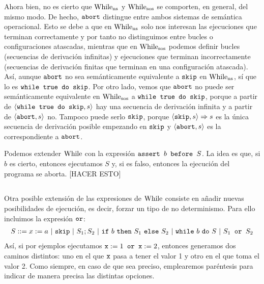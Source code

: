 Ahora bien, no es cierto que $\mathrm{While}_{\mathrm{ns}}$ y $\mathrm{While}_{\mathrm{sos}}$ se comporten, en general, del mismo modo. De hecho, $\texttt{abort}$ distingue entre ambos sistemas de semántica operacional. Esto se debe a que en $\mathrm{While}_{\mathrm{ns}}$ solo nos interesan las ejecuciones que terminan correctamente y por tanto no distinguimos entre bucles o configuraciones atascadas, mientras que en $\mathrm{While}_{\mathrm{sos}}$ podemos definir bucles (secuencias de derivación infinitas) y ejecuciones que terminan incorrectamente (secuencias de derivación finitas que terminan en una configuración atascada). Así, aunque $\texttt{abort}$ no sea semánticamente equivalente a $\texttt{skip}$ en $\mathrm{While}_{\mathrm{ns}}$, sí que lo es $\texttt{while true do skip}$. Por otro lado, vemos que $\texttt{abort}$ no puede ser semánticamente equivalente en $\mathrm{While}_{\mathrm{sos}}$ a $\texttt{while true do skip}$, porque a partir de $\langle \texttt{while true do skip}, s \rangle$ hay una secuencia de derivación infinita y a partir de $\langle \texttt{abort}, s \rangle$ no. Tampoco puede serlo $\texttt{skip}$, porque $\langle \texttt{skip}, s \rangle\Rightarrow s$ es la única secuencia de derivación posible empezando en $\texttt{skip}$ y $\langle \texttt{abort}, s \rangle$ es la correspondiente a $\texttt{abort}$. 

\begin{example}
Podemos extender $\mathrm{While}$ con la expresión $\texttt{assert }b\texttt{ before }S$. La idea es que, si $b$ es cierto, entonces ejecutamos $S$ y, si es falso, entonces la ejecución del programa se aborta. [HACER ESTO]
\end{example}


\subsection{}

Otra posible extensión de las expresiones de $\mathrm{While}$ consiste en añadir nuevas posibilidades de ejecución, es decir, forzar un tipo de no determinismo. Para ello incluimos la expresión $\texttt{or}$:
\[
    \begin{array}{l}
         S ::= x:=a\ |\ \n{skip}\ |\ S_1;S_2\ |\ \n{if}\ b\ \n{then}\ S_1\ \n{else}\ S_2\ |\ \n{while}\ b\ \n{do}\ S \ | \ S_1 \n{ or } S_2
    \end{array}
\]
Así, si por ejemplos ejecutamos $\texttt{x}:= 1 \texttt{ or } \texttt{x}:=2$, entonces generamos dos caminos distintos: uno en el que $\texttt{x}$ pasa a tener el valor 1 y otro en el que toma el valor 2. Como siempre, en caso de que sea preciso, emplearemos paréntesis para indicar de manera precisa las distintas opciones.


